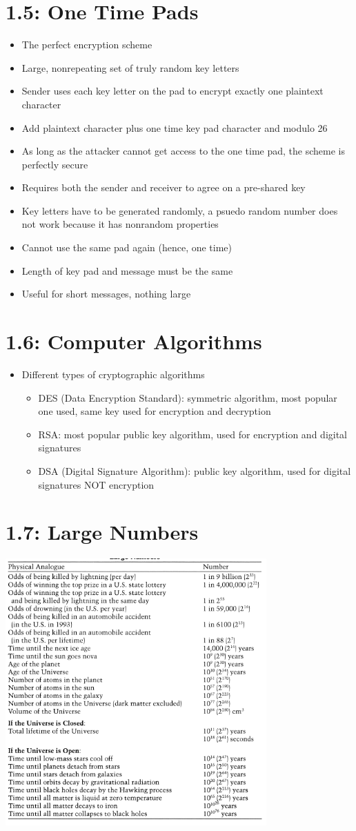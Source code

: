 \documentclass[]{article}
\begin{document}
\section{1.5: One Time Pads}
\begin{itemize}
    \item The perfect encryption scheme
    \item Large, nonrepeating set of truly random key letters
    \item Sender uses each key letter on the pad to encrypt exactly one plaintext character
    \item Add plaintext character plus one time key pad character and modulo 26
    \item As long as the attacker cannot get access to the one time pad, the scheme is perfectly secure
    \item Requires both the sender and receiver to agree on a pre-shared key
    \item Key letters have to be generated randomly, a psuedo random number does not work because it has nonrandom properties
    \item Cannot use the same pad again (hence, one time)
    \item Length of key pad and message must be the same
    \item Useful for short messages, nothing large
\end{itemize}
\section{1.6: Computer Algorithms}
\begin{itemize}
    \item Different types of cryptographic algorithms
    \begin{itemize}
        \item DES (Data Encryption Standard): symmetric algorithm, most popular one used, same key used for encryption and decryption
        \item RSA: most popular public key algorithm, used for encryption and digital signatures
        \item DSA (Digital Signature Algorithm): public key algorithm, used for digital signatures NOT encryption
    \end{itemize}
\end{itemize}
\section{1.7: Large Numbers}
\includegraphics[width=0.75\textwidth]{largenumbers}
\end{document}
